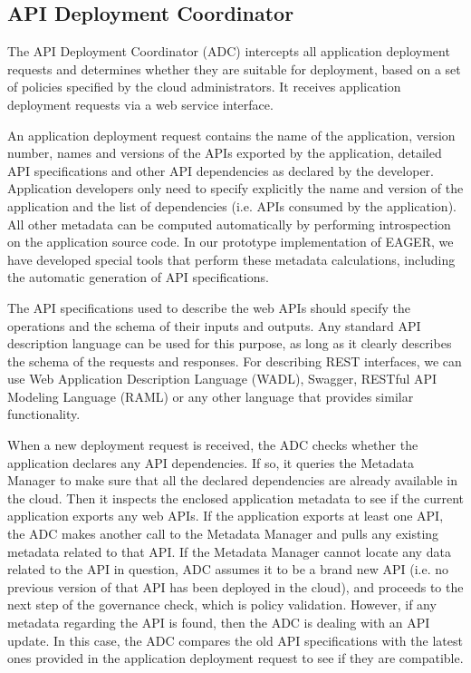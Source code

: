 \subsection{API Deployment Coordinator} 
\label{sec:adc}
The API Deployment Coordinator (ADC)
intercepts all application deployment requests and determines whether they are
suitable for deployment, based on a set of policies specified by the cloud
administrators. It receives application deployment requests via a web service
interface.

An application deployment request contains the name of the application,
version number, names and versions of the APIs exported by the application,
detailed API specifications and other API dependencies as declared by the
developer. Application developers only need to specify explicitly the name and
version of the application and the list of dependencies (i.e. APIs consumed by
the application). All other metadata can be computed automatically by
performing introspection on the application source code. In our prototype
implementation of EAGER, we have developed special tools that perform these
metadata calculations, including the automatic generation of API
specifications.

The API specifications used to describe the web APIs should specify the
operations and the schema of their inputs and outputs.  Any standard API
description language can be used for this purpose, as long as it clearly
describes the schema of the requests and responses. For describing REST
interfaces, we can use Web Application Description Language (WADL), Swagger,
RESTful API Modeling Language (RAML) or any other language that provides similar functionality. %

When a new deployment request is received, the ADC checks whether the
application declares any API dependencies. If so, it queries the Metadata
Manager to make sure that all the declared dependencies are already available
in the cloud.  Then it inspects the enclosed application metadata to see if
the current application exports any web APIs. If the application exports at
least one API, the ADC makes another call to the Metadata Manager and pulls
any existing metadata related to that API. If the Metadata Manager cannot
locate any data related to the API in question, ADC assumes it to be a brand
new API (i.e. no previous version of that API has been deployed in the cloud),
and proceeds to the next step of the governance check, which is policy
validation. However, if any metadata regarding the API is found, then the ADC
is dealing with an API update. In this case, the ADC compares the old API
specifications with the latest ones provided in the application deployment
request to see if they are compatible.

